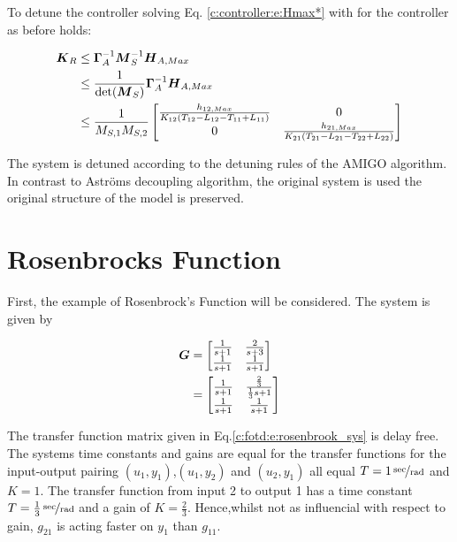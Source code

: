 To detune the controller solving Eq. \ref{c:controller:e:Hmax*} with for the controller as before holds:

\begin{align}
\begin{split}
\mbox{\boldmath$K$}_R &\leq \mbox{\boldmath$\Gamma$}_A^{-1} \mbox{\boldmath$M$}_S^{-1} \mbox{\boldmath$H$}_{A,Max} \\
&\leq \frac{1}{\det(\mbox{\boldmath$M$}_S)} \mbox{\boldmath$\Gamma$}_A^{-1} \mbox{\boldmath$H$}_{A,Max} \\
&\leq \frac{1}{M_{S,1}M_{S,2}}\begin{bmatrix}
\frac{h_{12,Max}}{K_{12}(T_{12}-L_{12}-T_{11}+L_{11})} & 0 \\
0 &\frac{h_{21,Max}}{K_{21}(T_{21}-L_{21}-T_{22}+L_{22})}
\end{bmatrix}
\end{split}
\end{align}

The system is detuned according to the detuning rules of the AMIGO algorithm. In contrast to Astr\"oms decoupling algorithm, the original system is used the original structure of the model is preserved.

\newpage
\section{Rosenbrocks Function}%
\label{c:fotd:s:rosenbrook}

First, the example of Rosenbrock's Function will be considered. The system is given by

\begin{align}
\begin{split}
\mbox{\boldmath$G$} &= \begin{bmatrix}
\frac{1}{s+1} & \frac{2}{s+3} \\
\frac{1}{s+1} & \frac{1}{s+1}
\end{bmatrix}
\\
&=\begin{bmatrix}
\frac{1}{s+1} & \frac{\frac{2}{3}}{\frac{1}{3}s+1} \\
\frac{1}{s+1} & \frac{1}{s+1}
\end{bmatrix} 
\end{split}
\label{c:fotd:e:rosenbrock_sys}
\end{align}

The transfer function matrix given in Eq.\ref{c:fotd:e:rosenbrook_sys} is delay free. The systems time constants and gains are equal for the transfer functions for the input-output pairing  $(u_1, y_1)$,$(u_1,y_2)$ and $(u_2,y_1)$ all equal $T = \unitfrac[1]{sec}{rad}$ and $K = 1$. The transfer function from input 2 to output 1 has a time constant $T = \unitfrac[\frac{1}{3}]{sec}{rad}$ and a gain of $K = \frac{2}{3}$. Hence,whilst not as influencial with respect to gain, $g_{21}$ is acting faster on $y_1$ than $g_{11}$.\\ 

